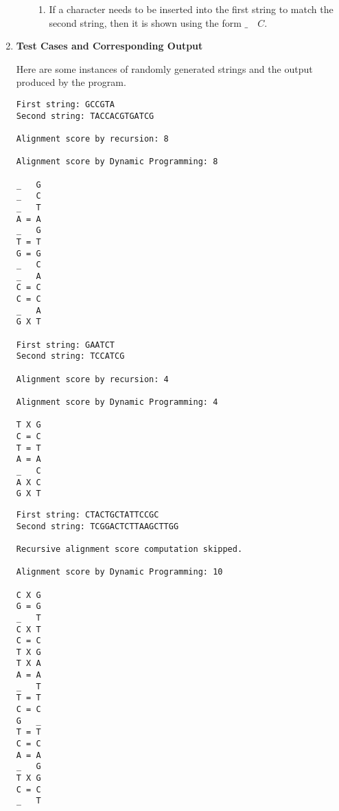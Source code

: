 \documentclass[paper=a4, fontsize=11pt]{scrartcl} %
\numberwithin{equation}{section} %
\numberwithin{figure}{section} %
\numberwithin{table}{section} %
\begin{document}
\begin{enumerate}
\begin{enumerate}
\begin{enumerate}
 \item If a character needs to be inserted into the first string to match the second string, then it is shown using the form $\_ \quad C$.
 
\end{enumerate}
 
\end{enumerate}

\item \textbf{Test Cases and Corresponding Output}

Here are some instances of randomly generated strings and the output produced by the program.

\begin{verbatim}
First string: GCCGTA
Second string: TACCACGTGATCG

Alignment score by recursion: 8

Alignment score by Dynamic Programming: 8

_   G
_   C
_   T
A = A
_   G
T = T
G = G
_   C
_   A
C = C
C = C
_   A
G X T

First string: GAATCT
Second string: TCCATCG

Alignment score by recursion: 4

Alignment score by Dynamic Programming: 4

T X G
C = C
T = T
A = A
_   C
A X C
G X T
\end{verbatim}
\clearpage
\begin{verbatim}
First string: CTACTGCTATTCCGC
Second string: TCGGACTCTTAAGCTTGG

Recursive alignment score computation skipped.

Alignment score by Dynamic Programming: 10

C X G
G = G
_   T
C X T
C = C
T X G
T X A
A = A
_   T
T = T
C = C
G   _
T = T
C = C
A = A
_   G
T X G
C = C
_   T


\end{verbatim}

\end{enumerate}

\end{document}
